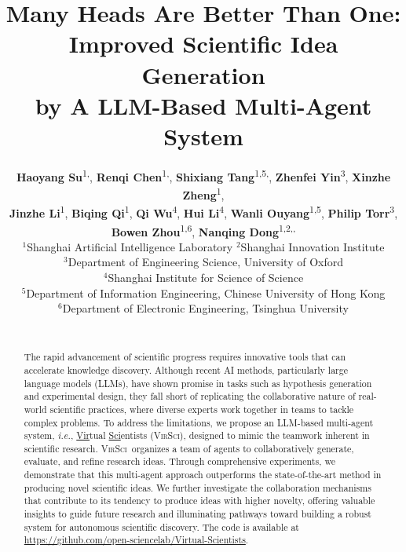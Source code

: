 \documentclass[11pt]{article}
\title{Many Heads Are Better Than One: Improved Scientific Idea Generation \\ by A LLM-Based Multi-Agent System}
\author{{\bf Haoyang Su}\textsuperscript{1,}\footnotemark[1], {\bf Renqi Chen}\textsuperscript{1,}\footnotemark[1], {\bf Shixiang Tang}\textsuperscript{1,5,}\footnotemark[2], {\bf Zhenfei Yin}\textsuperscript{3}, {\bf Xinzhe Zheng}\textsuperscript{1},\\
{\bf Jinzhe Li}\textsuperscript{1}, {\bf Biqing Qi}\textsuperscript{1},  {\bf Qi Wu}\textsuperscript{4}, {\bf Hui Li}\textsuperscript{4}, {\bf Wanli Ouyang}\textsuperscript{1,5}, {\bf Philip Torr}\textsuperscript{3},\\
{\bf Bowen Zhou}\textsuperscript{1,6},
{\bf Nanqing Dong}\textsuperscript{1,2,}\footnotemark[2]\textsuperscript{,}\footnotemark[3]\\
$^{1}$Shanghai Artificial Intelligence Laboratory\quad
$^{2}$Shanghai Innovation Institute\\
$^{3}$Department of Engineering Science, University of Oxford \\
$^{4}$Shanghai Institute for Science of Science\\
$^{5}$Department of Information Engineering, Chinese University of Hong Kong\\
$^{6}$Department of Electronic Engineering, Tsinghua University\\
\\
}
\def\modelname{\textsc{VirSci\xspace}}
\begin{document}
\maketitle
{
\renewcommand{\thefootnote}{\fnsymbol{footnote}}
{}
{}
}

\begin{abstract}
The rapid advancement of scientific progress requires innovative tools that can accelerate knowledge discovery. Although recent AI methods, particularly large language models (LLMs), have shown promise in tasks such as hypothesis generation and experimental design, they fall short of replicating the collaborative nature of real-world scientific practices, where diverse experts work together in teams to tackle complex problems. To address the limitations, we propose an LLM-based multi-agent system, \textit{i.e.}, \underline{Vir}tual \underline{Sci}entists (\modelname), designed to mimic the teamwork inherent in scientific research. \modelname\ organizes a team of agents to collaboratively generate, evaluate, and refine research ideas. 
Through comprehensive experiments, we demonstrate that this multi-agent approach outperforms the state-of-the-art method in producing novel scientific ideas.
We further investigate the collaboration mechanisms that contribute to its tendency to produce ideas with higher novelty, offering valuable insights to guide future research and illuminating pathways toward building a robust system for autonomous scientific discovery. The code is available at \url{https://github.com/open-sciencelab/Virtual-Scientists}.
 

\end{abstract}
\end{document}
